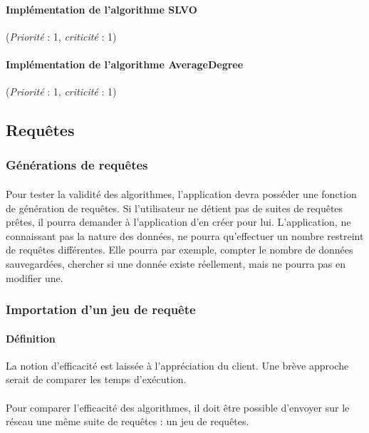 \documentclass[12pt]{article}
\newcommand{\besoin}[2] {
  (\textit{Priorité} : #1, \textit{criticité} : #2)
}
\begin{document}
\paragraph{Implémentation de l'algorithme \textbf{SLVO}} \besoin{1}{1}
\paragraph{Implémentation de l'algorithme \textbf{AverageDegree}} \besoin{1}{1}  

\subsection{Requêtes}

\subsubsection{Générations de requêtes}

\paragraph{} Pour tester la validité des algorithmes, l'application devra posséder une fonction de génération de requêtes. 
Si l'utilisateur ne détient pas de suites de requêtes prêtes, il pourra demander à l'application d'en créer pour lui. 
L'application, ne connaissant pas la nature des données, ne pourra qu'effectuer un nombre restreint de requêtes différentes. 
Elle pourra par exemple, compter le nombre de données sauvegardées, chercher si une donnée existe réellement, mais ne pourra pas en modifier une.


\subsubsection{Importation d'un jeu de requête}

\paragraph{Définition} La notion d'efficacité est laissée à l'appréciation du client. Une brève approche serait de comparer les temps d'exécution.

\paragraph{} Pour comparer l'efficacité des algorithmes, il doit être possible d'envoyer sur le réseau une même suite de requêtes : un jeu de requêtes.
\end{document}

